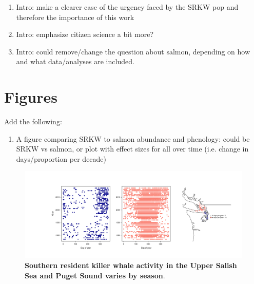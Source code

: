 \documentclass{article}
\begin{document}
\begin{enumerate}
\item Intro: make a clearer case of the urgency faced by the SRKW pop and therefore the importance of this work
\item Intro: emphasize citizen science a bit more?
\item Intro: could remove/change the question about salmon, depending on how and what data/analyses are included.
\end{enumerate}

\section* {Figures}
Add the following:
\begin{enumerate}
\item A figure comparing SRKW to salmon abundance and phenology: could be SRKW vs salmon, or plot with effect sizes for all over time (i.e. change in days/proportion per decade)
\end{enumerate}

\begin{figure}[p]
\includegraphics{../analyses/figures/OrcaPhenPlots/srkw_phenmap.pdf} 
\caption{\textbf{Southern resident killer whale activity in the Upper Salish Sea and Puget Sound varies by season}. }
 \label{fig:phenplot}
 \end{figure}
 
\end{document}
